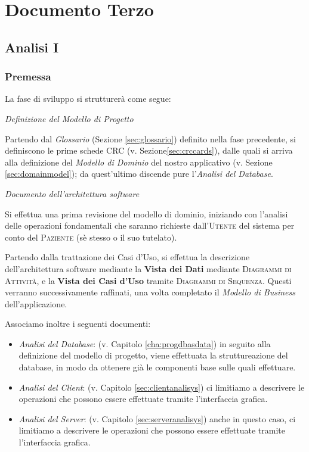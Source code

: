\part{Documento Terzo}
\chapter{Analisi I}\label{cha:pds}
\minitoc\mtcskip
\section{Premessa}
La fase di sviluppo si strutturerà come segue:
\begin{itemize}
\diam \textit{Definizione del Modello di Progetto}

Partendo dal \textit{Glossario} (Sezione \vref{sec:glossario}) definito nella fase 
precedente, si %
definiscono le prime schede CRC (v. Sezione\vref{sec:crccards}), dalle quali si 
arriva  alla definizione del \textit{Modello di Dominio} del nostro applicativo 
(v. Sezione \vref{sec:domainmodel}); da quest'ultimo discende pure
l'\textit{Analisi del Database}.
\medskip

\diam \textit{Documento dell'architettura software}

Si effettua una prima revisione del modello di dominio, iniziando con l'analisi
delle operazioni fondamentali che saranno richieste dall'\textsc{Utente} del sistema
per conto del \textsc{Paziente} (sè stesso o il suo tutelato).
\medskip

Partendo dalla trattazione dei Casi d'Uso, si effettua la descrizione 
dell'architettura software mediante la \textbf{Vista dei Dati} mediante \textsc{Diagrammi
di Attività}, e la \textbf{Vista dei Casi d'Uso} tramite \textsc{Diagrammi di Sequenza}.
Questi verranno successivamente raffinati, una volta completato il \textit{Modello
di Business} dell'applicazione.

\end{itemize}
Associamo inoltre i seguenti documenti:
\begin{itemize}
	\item \textit{Analisi del Database}:
	(v. Capitolo \vref{cha:progdbasdata}) in seguito alla definizione del
	modello di progetto, viene effettuata la struttureazione del database,
	in modo da ottenere già le componenti base sulle quali effettuare.
	\item \textit{Analisi del Client}:
	(v. Capitolo \vref{sec:clientanalisys}) ci limitiamo a descrivere le
	operazioni che possono essere effettuate tramite l'interfaccia grafica.
	\item \textit{Analisi del Server}:
	(v. Capitolo \vref{sec:serveranalisys}) anche in questo caso, ci limitiamo 
	a descrivere le operazioni che possono essere effettuate tramite 
	l'interfaccia grafica.
\end{itemize}
\bigskip

